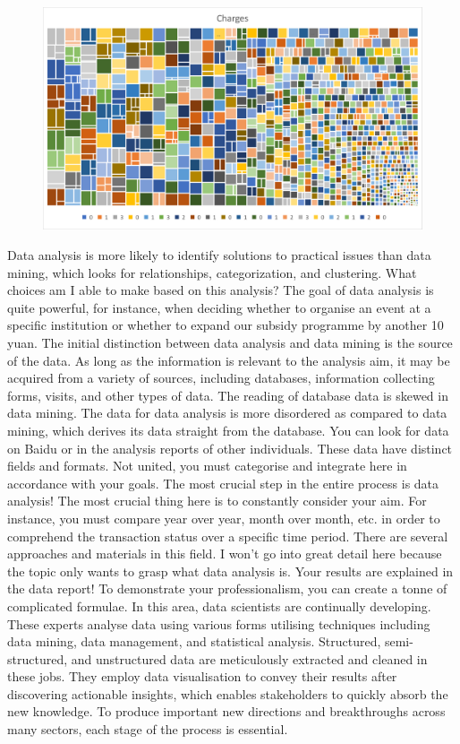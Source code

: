 \documentclass[journal]{IEEEtran}
\begin{document}
\begin{figure}[h]
  \centering
  \includegraphics [width= 3.55 in]{11.png}
\caption{}
  \label{storage}
\end{figure}

\par Data analysis is more likely to identify solutions to practical issues than data mining, which looks for relationships, categorization, and clustering. What choices am I able to make based on this analysis? The goal of data analysis is quite powerful, for instance, when deciding whether to organise an event at a specific institution or whether to expand our subsidy programme by another 10 yuan. The initial distinction between data analysis and data mining is the source of the data. As long as the information is relevant to the analysis aim, it may be acquired from a variety of sources, including databases, information collecting forms, visits, and other types of data. The reading of database data is skewed in data mining. The data for data analysis is more disordered as compared to data mining, which derives its data straight from the database. You can look for data on Baidu or in the analysis reports of other individuals. These data have distinct fields and formats. Not united, you must categorise and integrate here in accordance with your goals. The most crucial step in the entire process is data analysis! The most crucial thing here is to constantly consider your aim. For instance, you must compare year over year, month over month, etc. in order to comprehend the transaction status over a specific time period. There are several approaches and materials in this field. I won't go into great detail here because the topic only wants to grasp what data analysis is. Your results are explained in the data report! To demonstrate your professionalism, you can create a tonne of complicated formulae. In this area, data scientists are continually developing. These experts analyse data using various forms utilising techniques including data mining, data management, and statistical analysis. Structured, semi-structured, and unstructured data are meticulously extracted and cleaned in these jobs. They employ data visualisation to convey their results after discovering actionable insights, which enables stakeholders to quickly absorb the new knowledge. To produce important new directions and breakthroughs across many sectors, each stage of the process is essential.
\end{document}
